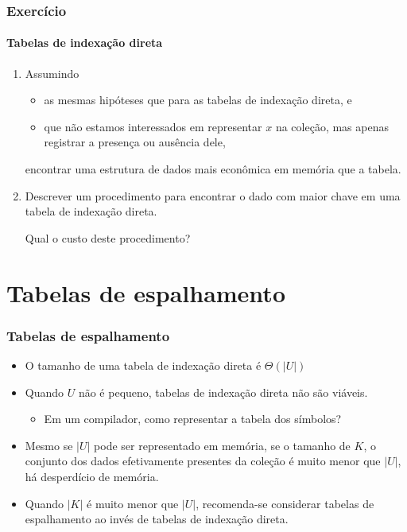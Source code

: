 \documentclass{beamer}
\begin{document}
\begin{frame}

  \frametitle{Exercício}
  \framesubtitle{Tabelas de indexação direta}

  \begin{enumerate}
    \item Assumindo 
      \begin{itemize}
      \item as mesmas hipóteses que para as tabelas de indexação
        direta, e 
      \item que não estamos interessados em representar $x$ na
      coleção, mas apenas registrar a presença ou ausência dele, 
      \end{itemize}
      encontrar uma estrutura de dados mais econômica em memória que
      a tabela.

    \item Descrever um procedimento para encontrar o dado com maior chave
      em uma tabela de indexação direta.

      Qual o custo deste procedimento?
  \end{enumerate}

\end{frame}

\section{Tabelas de espalhamento}

\begin{frame}

  \frametitle{Tabelas de espalhamento}

  \begin{itemize}

    \item O tamanho de uma tabela de indexação direta é $\Theta(| U |)$

    \item Quando $U$ não é pequeno, tabelas de indexação direta não são
      viáveis.

      \begin{itemize}

        \item Em um compilador, como representar a tabela dos símbolos?

      \end{itemize}

    \item Mesmo se $| U |$ pode ser representado em memória, se o tamanho de
      $K$, o conjunto dos dados efetivamente presentes da coleção é muito menor
      que $| U |$, há desperdício de memória.

    \item Quando $| K |$ é muito menor que $| U |$, recomenda-se considerar
      \alert{tabelas de espalhamento} ao invés de tabelas de indexação direta.

  \end{itemize}

\end{frame}
\end{document}
